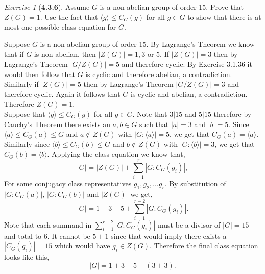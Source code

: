 \documentclass[12pt]{amsart}
\makeatletter
\theoremstyle{remark}
\newtheorem*{exercise}{Exercise}%
\renewenvironment{proof}[1][\proofname]{\par\doublespacing
  \pushQED{\qed}%
  \normalfont \topsep6\p@\@plus6\p@\relax
  \list{}{%
    \settowidth{\leftmargin}{\itshape\proofname:\hskip\labelsep}%
    \setlength{\labelwidth}{0pt}%
    \setlength{\itemindent}{-\leftmargin}%
  }%
  \item[\hskip\labelsep\itshape#1\@addpunct{:}]\ignorespaces
}{%
  \popQED\endlist\@endpefalse
  \singlespacing
}
\theoremstyle{mycomment}
\makeatother
\begin{document}
\begin{exercise}[\textbf{4.3.6}] Assume $G$ is a non-abelian group of order 15. Prove that $Z(G) = 1$. Use the fact that $\langle g \rangle \leq C_G(g)$ for all $g \in G$ to show that there is at most one possible class equation for $G$. 
  \begin{proof} Suppose $G$ is a non-abelian group of order 15. By Lagrange's Theorem we know that
    if $G$ is non-abelian, then $|Z(G)| = 1, 3 \text{ or }5$. If $|Z(G)| = 3$ then by Lagrange's Theorem $|G/Z(G)| = 5$ and therefore cyclic. By Exercise 3.1.36 it would then follow that $G$ is cyclic and therefore abelian, a contradiction. Similarly if $|Z(G)| = 5$ then by Lagrange's Theorem $|G/Z(G)| = 3$ and therefore cyclic. Again it follows that $G$ is cyclic and abelian, a contradiction. Therefore $Z(G) = 1$.\\

    Suppose that $\langle g \rangle \leq C_G(g)$ for all $g \in G$. Note that $3|15$ and $5|15$ therefore by Cauchy's Theorem there exists an $a, b \in G$ such that $|a| = 3$ and $|b| = 5$.
    Since $\langle a \rangle \leq C_G(a) \leq G$ and $a \not\in Z(G)$ with $|G : \langle a \rangle| = 5$, we get that $C_G(a) = \langle a \rangle$. Similarly since $\langle b \rangle \leq C_G(b) \leq G$ and $b \not\in Z(G)$ with $|G : \langle b \rangle| = 3$, we get that $C_G(b) = \langle b \rangle$. Applying the class equation we know that,
      \begin{equation*}
      |G| = |Z(G)| + \sum_{i = 1}^r|G:C_G(g_i)|,
    \end{equation*}
    For some conjugacy class representatives $g_1, g_2, \dots g_r$.
    By substitution of $|G:C_G(a)|$, $|G:C_G(b)|$ and $|Z(G)|$ we get, 
    \begin{equation*}
      |G| = 1 + 3 + 5 + \sum_{i = 1}^{r-2}|G:C_G(g_i)|.
    \end{equation*}
    Note that each summand in $\sum_{i = 1}^{r-2}|G:C_G(g_i)|$ must be a divisor of $|G| = 15$ and 
    total to 6. It cannot be $5 + 1$ since that would imply there exists a $|C_G(g_i)| = 15$ which would have $g_i \in Z(G)$. Therefore the final class equation looks like this, 
    \begin{equation*}
      |G| = 1 + 3 + 5 + (3 + 3).
    \end{equation*}
  \end{proof}
\end{exercise}
\vspace{.15in}
\end{document}

